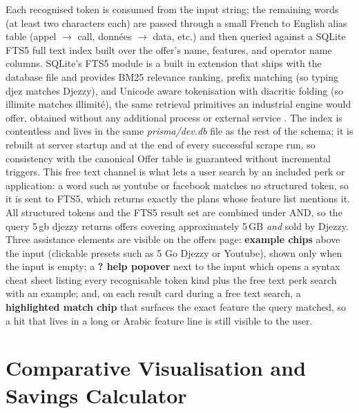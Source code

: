 Each recognised token is consumed from the input string; the remaining words (at least two characters each) are passed through a small French to English alias table (appel $\rightarrow$ call, données $\rightarrow$ data, etc.) and then queried against a SQLite FTS5 full text index built over the offer's name, features, and operator name columns. SQLite's FTS5 module is a built in extension that ships with the database file and provides BM25 relevance ranking, prefix matching (so typing \guillemotleft{}djez\guillemotright{} matches \guillemotleft{}Djezzy\guillemotright{}), and Unicode aware tokenisation with diacritic folding (so \guillemotleft{}illimite\guillemotright{} matches \guillemotleft{}illimité\guillemotright{}), the same retrieval primitives an industrial engine would offer, obtained without any additional process or external service \parencite{SQLiteFTS5}. The index is contentless and lives in the same \textit{prisma/dev.db} file as the rest of the schema; it is rebuilt at server startup and at the end of every successful scrape run, so consistency with the canonical Offer table is guaranteed without incremental triggers. This free text channel is what lets a user search by an included perk or application: a word such as \guillemotleft{}youtube\guillemotright{} or \guillemotleft{}facebook\guillemotright{} matches no structured token, so it is sent to FTS5, which returns exactly the plans whose feature list mentions it. All structured tokens and the FTS5 result set are combined under AND, so the query \guillemotleft{}5\,gb djezzy\guillemotright{} returns offers covering approximately 5\,GB \emph{and} sold by Djezzy. Three assistance elements are visible on the offers page: \textbf{example chips} above the input (clickable presets such as \guillemotleft{}5 Go Djezzy\guillemotright{} or \guillemotleft{}Youtube\guillemotright{}), shown only when the input is empty; a \textbf{\guillemotleft{}?\guillemotright{} help popover} next to the input which opens a syntax cheat sheet listing every recognisable token kind plus the free text perk search with an example; and, on each result card during a free text search, a \textbf{highlighted match chip} that surfaces the exact feature the query matched, so a hit that lives in a long or Arabic feature line is still visible to the user.

\section{Comparative Visualisation and Savings Calculator}


